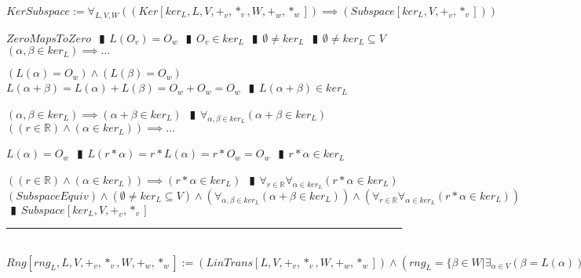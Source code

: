 \documentclass{book}
\newcommand{\abr}{:=}
\newcommand{\pipe}{$\phantom{(}\vrectangleblack\phantom{)}$}
\newcommand{\pr}[1]{\left(#1\right)}
\begin{document}
$KerSubspace \abr \forall_{L, V, W}\pr{(Ker[ker_L, L, V, +_v, *_v, W, +_w, *_w]) \implies (Subspace[ker_L, V, +_v, *_v])}$
\begin{enumerate}
  \lit $ZeroMapsToZero$ \pipe $L(O_v) = O_w$ \pipe $O_v \in ker_L$ \pipe $\emptyset \neq ker_L$ \pipe $\emptyset \neq ker_L \subseteq V$
  \lit $(\alpha, \beta \in ker_L) \implies \ldots$
  \begin{enumerate}
    \lit $\pr{L(\alpha) = O_w} \land \pr{L(\beta) = O_w}$ \lit $L(\alpha + \beta) = L(\alpha) + L(\beta) = O_w + O_w = O_w$ \pipe $L(\alpha + \beta) \in ker_L$
  \end{enumerate}
  \lit $(\alpha, \beta \in ker_L) \implies (\alpha + \beta \in ker_L)$ \pipe $\forall_{\alpha, \beta \in ker_L}(\alpha + \beta \in ker_L)$
  \lit $\pr{(r \in \mathbb{R}) \land (\alpha \in ker_L)} \implies \ldots$
  \begin{enumerate}
    \lit $L(\alpha) = O_w$ \pipe $L(r * \alpha) = r * L(\alpha) = r * O_w = O_w$ \pipe $r * \alpha \in ker_L$
  \end{enumerate}
  \lit $\pr{(r \in \mathbb{R}) \land (\alpha \in ker_L)} \implies (r * \alpha \in ker_L)$ \pipe $\forall_{r \in \mathbb{R}} \forall_{\alpha \in ker_L}(r * \alpha \in ker_L)$
  \lit $(SubspaceEquiv) \land (\emptyset \neq ker_L \subseteq V) \land \pr{\forall_{\alpha, \beta \in ker_L}(\alpha + \beta \in ker_L)} \land \pr{\forall_{r \in \mathbb{R}} \forall_{\alpha \in ker_L}(r * \alpha \in ker_L)}$ \pipe $Subspace[ker_L, V, +_v, *_v]$
\end{enumerate} \vspace{.75mm} \hrule \vspace{.75mm} \ \\ 

$Rng[rng_L, L, V, +_v, *_v, W, +_w, *_w] \abr (LinTrans[L, V, +_v, *_v, W, +_w, *_w]) \land \pr{rng_L = \{\beta \in W | \exists_{\alpha \in V}\pr{\beta = L(\alpha)}\}}$ \\
\end{document}
